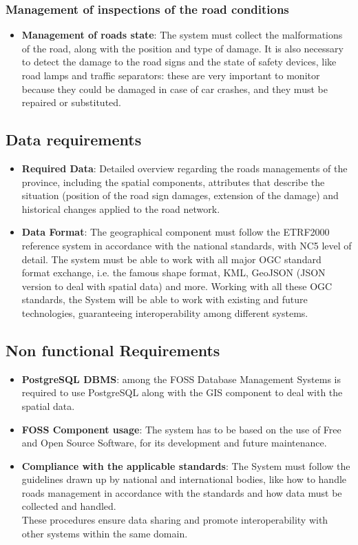    \subsubsection{\textbf{Management of inspections of the road conditions}} 
    \begin{itemize}
        \item{\textbf{Management of roads state}}: The system must collect the malformations of the road, along with the position and type of damage.
        It is also necessary to detect the damage to the road signs and the state of safety devices, like road lamps and traffic separators: these are very important to monitor because they could be damaged in case of car crashes, and they must be repaired or substituted.
     \end{itemize}

     \subsection{Data requirements}
        \begin{itemize}
            \item \textbf{Required Data}: Detailed overview regarding the roads managements of the province, including the spatial components, attributes that describe the situation (position of the road sign damages, extension of the damage) and historical changes applied to the road network.
             \item \textbf{Data Format}:  The geographical component must follow the ETRF2000 reference system in accordance with the national standards, with NC5 level of detail.
             The system must be able to work with all major OGC standard format exchange, i.e. the famous shape format, KML, GeoJSON (JSON version to deal with spatial data) and more.
             Working with all these OGC standards, the System will be able to work with existing and future technologies, guaranteeing interoperability among different systems.
        \end{itemize}
\pagebreak
\subsection{Non functional Requirements}
\begin{itemize}
    \item \textbf{PostgreSQL DBMS}: among the FOSS Database
    Management Systems is required to use PostgreSQL along with the GIS component to deal with the spatial data.
     \item \textbf{FOSS Component usage}: The system has to be based on the use of Free and Open Source Software, for its development and future maintenance.
    \item \textbf{Compliance with the applicable standards}: The System must follow the guidelines drawn up by national and international bodies, like how to handle roads management in accordance with the standards and how data must be collected and handled.
    \\
    These procedures ensure data sharing and promote interoperability with other systems within the same domain.
\end{itemize}